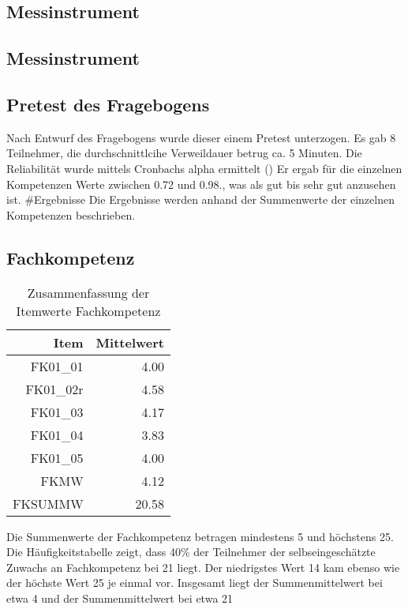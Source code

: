 \documentclass[12pt, bibliography=totoc]{scrartcl}
\begin{document}
\subsection{Messinstrument}\label{messinstrument}

\subsection{Messinstrument}\label{messinstrument-1}

\subsection{Pretest des Fragebogens}\label{pretest-des-fragebogens}

Nach Entwurf des Fragebogens wurde dieser einem Pretest unterzogen. Es
gab 8 Teilnehmer, die durchschnittlcihe Verweildauer betrug ca. 5
Minuten. Die Reliabilität wurde mittels Cronbachs alpha ermittelt
(\textcite{Wassa}) Er ergab für die einzelnen Kompetenzen Werte zwischen
0.72 und 0.98., was als gut bis sehr gut anzusehen ist. \#Ergebnisse Die
Ergebnisse werden anhand der Summenwerte der einzelnen Kompetenzen
beschrieben.

\subsection{Fachkompetenz}\label{fachkompetenz}

\begin{table}[H]
\centering
\caption{Zusammenfassung der Itemwerte Fachkompetenz}
\begin{tabular}{rr}
  \hline
 Item & Mittelwert \\
  \hline
FK01\_01 & 4.00 \\
  FK01\_02r & 4.58 \\
  FK01\_03 & 4.17 \\
  FK01\_04 & 3.83 \\
  FK01\_05 & 4.00 \\
  FKMW & 4.12 \\
  FKSUMMW & 20.58 \\
   \hline
\end{tabular}
\end{table}

Die Summenwerte der Fachkompetenz betragen mindestens 5 und höchstens
25. Die Häufigkeitstabelle zeigt, dass 40\% der Teilnehmer der
selbseingeschätzte Zuwachs an Fachkompetenz bei 21 liegt. Der
niedrigstes Wert 14 kam ebenso wie der höchste Wert 25 je einmal vor.
Insgesamt liegt der Summenmittelwert bei etwa 4 und der Summenmittelwert
bei etwa 21
\end{document}
